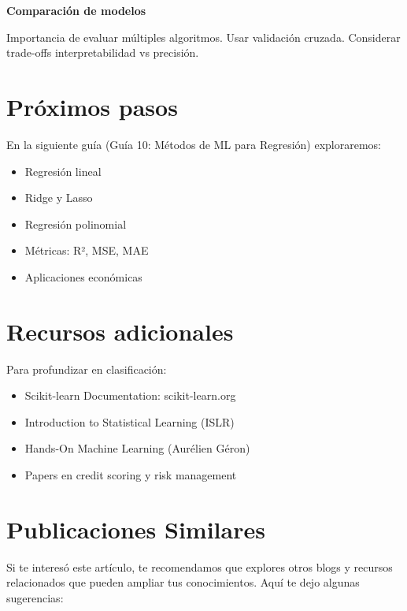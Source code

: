\documentclass[
  doc,
  floatsintext,
  longtable,
  a4paper,
  nolmodern,
  notxfonts,
  notimes,
  12pt,
  colorlinks=true,linkcolor=blue,citecolor=blue,urlcolor=blue]{apa7}
\providecommand{\tightlist}{%
  \setlength{\itemsep}{0pt}\setlength{\parskip}{0pt}}
\begin{document}
\textbf{Comparación de modelos}

Importancia de evaluar múltiples algoritmos. Usar validación cruzada.
Considerar trade-offs interpretabilidad vs precisión.

\section{Próximos pasos}\label{pruxf3ximos-pasos}

En la siguiente guía (Guía 10: Métodos de ML para Regresión)
exploraremos:

\begin{itemize}
\tightlist
\item
  Regresión lineal
\item
  Ridge y Lasso
\item
  Regresión polinomial
\item
  Métricas: R², MSE, MAE
\item
  Aplicaciones económicas
\end{itemize}

\section{Recursos adicionales}\label{recursos-adicionales}

Para profundizar en clasificación:

\begin{itemize}
\tightlist
\item
  Scikit-learn Documentation: scikit-learn.org
\item
  Introduction to Statistical Learning (ISLR)
\item
  Hands-On Machine Learning (Aurélien Géron)
\item
  Papers en credit scoring y risk management
\end{itemize}

\section{Publicaciones Similares}\label{publicaciones-similares}

Si te interesó este artículo, te recomendamos que explores otros blogs y
recursos relacionados que pueden ampliar tus conocimientos. Aquí te dejo
algunas sugerencias:
\end{document}
